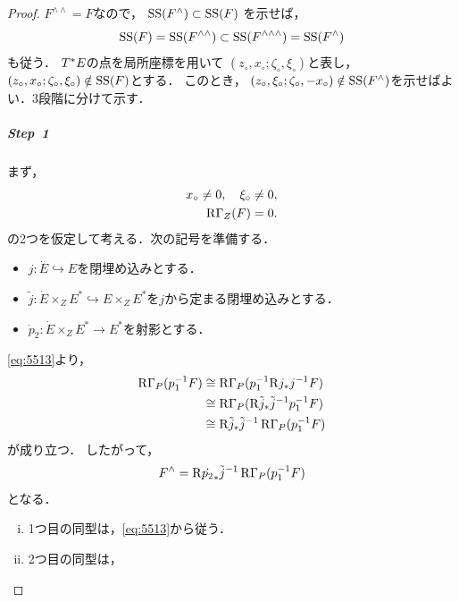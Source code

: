 \begin{proof}    
    \(F^{\wedge\wedge}=F\)なので，
    \(\muS(F^{\wedge})\subset\muS(F)\)
    を示せば，
    \[
        \muS(F)
        =\muS(F^{\wedge\wedge})
        \subset\muS(F^{\wedge\wedge\wedge})
        =\muS(F^{\wedge})
    \]も従う．
    \(\cotb[E]\)の点を局所座標を用いて
    \(
        (z_{\circ},x_{\circ};\zeta_{\circ},\xi_{\circ})
    \)と表し，\(
        (z_{\circ},x_{\circ};\zeta_{\circ},\xi_{\circ})
        \notin 
        \muS(F)
    \)とする．
    このとき，
    \(
        (z_{\circ},\xi_{\circ};\zeta_{\circ},-x_{\circ})
        \notin 
        \muS(F^{\wedge})
    \)を示せばよい．3段階に分けて示す．
    \subparagraph{Step~1}%
    まず，
    \begin{align}
        x_{\circ}\ne0,
        \quad
        \xi_{\circ}\ne0,\label{eq:5512}\\
        \RG_{Z}(F)=0.\label{eq:5513}    
    \end{align}
    の2つを仮定して考える．次の記号を準備する．
    \begin{itemize}
        \item \(j\colon \dot{E}\hookrightarrow E\)を閉埋め込みとする．
        \item \(\tilde{j}\colon \dot{E}\mathbin{\times_{Z}} E^{\ast}\hookrightarrow E\mathbin{\times_{Z}} E^{\ast}\)を\(j\)から定まる閉埋め込みとする．
        \item \(\dot{p}_{2}\colon \dot{E}\mathbin{\times_{Z}} E^{\ast}\to E^{\ast}\)を射影とする．
    \end{itemize}
    \eqref{eq:5513}より，
    \begin{align*}
        \RG_{P}(p_1^{-1}F)
        &\cong \RG_{P}(p_1^{-1}\Rder{j_{\ast}}j^{-1}F)\\
        &\cong \RG_{P}(\Rder{\tilde{j}_{\ast}}\tilde{j}^{-1}p_1^{-1}F)\\
        &\cong \Rder{\tilde{j}_{\ast}}\tilde{j}^{-1}\RG_{P}(p_1^{-1}F)
    \end{align*}
    が成り立つ．
    したがって，\[
        F^{\wedge}
        =
        \Rder{{\dot{p_{2}}_{\ast}}}\tilde{j}^{-1}\RG_{P}(p_1^{-1}F)    
    \]
    となる．
    \begin{CMT*}
        \begin{enumerate}[(i)]
            \item 
            1つ目の同型は，\eqref{eq:5513}から従う．
            \item         
            2つ目の同型は，

\end{enumerate}
\end{CMT*}
\end{proof}
